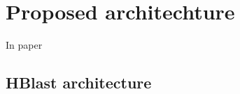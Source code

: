 \section{Proposed architechture}
\label{sec:introduction}

In paper \cite{vipin2019}
\subsection{HBlast architecture}
